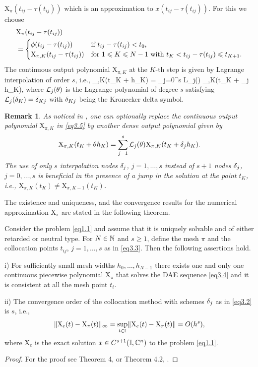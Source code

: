 \documentclass[final,reqno]{siamltex}
\newtheorem{remark}[theorem]{Remark}
\begin{document}
$\mathrm{X}_{\pi}(t_{ij}-\tau(t_{ij}))$ which is an approximation to $x(t_{ij}-\tau(t_{ij}))$. For this we choose
%
\[
\begin{split} 
&  \mathrm{X}_{\pi}(t_{ij}-\tau(t_{ij})) \\
 & =  
 \begin{cases}
  \phi(t_{ij}-\tau(t_{ij}))                & \mbox{if } t_{ij}-\tau(t_{ij}) < t_0, \\
  \mathrm{X}_{\pi,K}(t_{ij}-\tau(t_{ij}))  & \mbox{for $ 1 \leqslant K \leqslant N-1$ with } t_K < t_{ij}-\tau(t_{ij}) \leqslant t_{K+1}.
 \end{cases}
 \end{split} 
\]
%
The continuous output polynomial $\mathrm{X}_{\pi,K}$ at the $K$-th step is given by Lagrange interpolation of order $s$, i.e.,
%
\be\label{eq3.5}
 _{\pi,K}(t_K + \tet h_K) = \sum_{j=0}^s {\cal L}_j(\tet) _{\pi,K}(t_K + \de_j h_K),
\ee
%
where ${\cal L}_j(\tet)$ is the Lagrange polynomial of degree $s$ satisfying ${\cal L}_j(\de_K) = \de_{Kj}$ with $\delta_{Kj}$ being the Kronecker delta symbol.

\begin{remark}
 As noticed in \cite{GugH01,GugH07}, one can optionally replace the continuous output polynomial $\mathrm{X}_{\pi,K}$ in \eqref{eq3.5} by another dense output polynomial given by
 \[
  \mathrm{X}_{\pi,K}(t_K + \tet h_K) = \sum_{j=1}^s {\cal L}_j(\tet) \mathrm{X}_{\pi,K}(t_K + \de_j h_K).
 \]
 The use of only $s$ interpolation nodes $\delta_j$, $j=1,\dots,s$ instead of $s+1$ nodes $\delta_j$, $j=0,\dots,s$ is beneficial in the presence of a jump in the solution at the
 point $t_K$, i.e., $\mathrm{X}_{\pi,K}(t_K) \not= \mathrm{X}_{\pi,K-1}(t_K)$.
\end{remark}

The existence and uniqueness, and the convergence results for the numerical approximation $\mathrm{X}_{\pi}$ are stated in the following theorem.

\begin{theorem}\label{Thm6.1}
Consider the problem \eqref{eq1.1} and assume that it is uniquely solvable and of either retarded or neutral type. 
For $N \in \mathbb{N}$ and $s \geq 1$, define the mesh $\pi$ and the collocation points $t_{ij}$, $j=1,\dots,s$ as in \eqref{eq3.3}. 
Then the following assertions hold.
\begin{compactenum}
 \item[i)] For sufficiently small mesh widths $h_0,\dots,h_{N-1}$ there exists one and only one continuous piecewise polynomial $\mathrm{X}_{\pi}$ that solves 
 the DAE sequence \eqref{eq3.4} and it is consistent at all the mesh point $t_i$.
 \item[ii)] The convergence order of the collocation method with schemes $\delta_j$ as in \eqref{eq3.2} is $s$, i.e., 
 \[
  \| \mathrm{X}_e(t) - \mathrm{X}_{\pi}(t) \|_{\infty} = \underset{t \in \mathbb{I}}{\sup} \| \mathrm{X}_e(t) - \mathrm{X}_{\pi}(t) \| = O(h^s),
 \]
%
 where $\mathrm{X}_e$ is the exact solution  $x \in C^{s+1}(\mathbb{I},\mathbb{C}^n)$ to the problem \eqref{eq1.1}.
\end{compactenum}
\end{theorem}
\begin{proof}
For the proof see Theorem 4, \cite{Hau97} or Theorem 4.2, \cite{GugH07}.
\end{proof}
%
\end{document}
